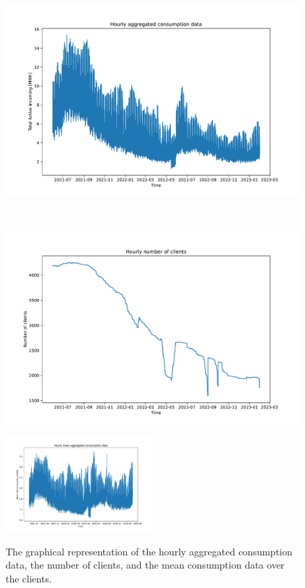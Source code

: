 \begin{figure}[H]
\begin{minipage}[b]{8.5cm}
\centering
\includegraphics[width=1\textwidth]{images/demand/data_plot}
\subcaption{}
\label{fig:demanddataplot}
\end{minipage}
\ \hspace{2mm} \
\begin{minipage}[b]{8.5cm}
\centering
\includegraphics[width=1\textwidth]{images/demand/clients_plot}
\subcaption{}
\label{fig:clientsplot}
\end{minipage}
\begin{minipage}[b]{17cm}
\centering
\includegraphics[width=0.5\textwidth]{images/demand/mean_data_plot}
\subcaption{}
\label{fig:meandemanddataplot}
\end{minipage}
\caption{The graphical representation of the hourly  aggregated consumption data,  the number of clients, and  the mean consumption data over the clients.}
\end{figure}

